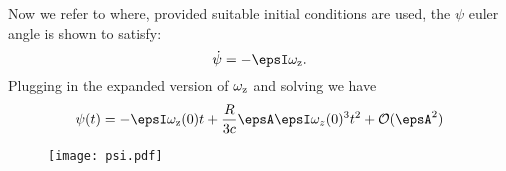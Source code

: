 \documentclass[/home/greg/Thesis/main/main.tex]{subfiles}
\begin{document}
Now we refer to \citet{Landau1969} where, provided suitable initial conditions
are used, the $\psi$ euler angle is shown to satisfy:
\begin{equation}
\dot{\psi} = -\epsI \wz.
\end{equation}
Plugging in the expanded version of $\omega_{\mathrm{z}}$ and solving we have
\begin{equation}
\psi(t) = -\epsI\wz(0) t + \frac{R}{3c} \epsA \epsI \omega_{z}(0)^{3} t^{2} + \mathcal{O}(\epsA^{2})
\end{equation}
\begin{figure}[htb]
\centering
\texttt{[image: psi.pdf]}
\caption{}
\label{}
\end{figure}


%


\biblio
\end{document}
